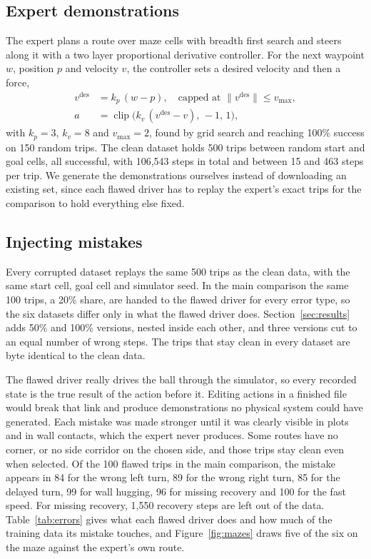 \documentclass[conference]{IEEEtran}
\DeclareMathOperator{\clip}{clip}
\begin{document}
\subsection{Expert demonstrations}
The expert plans a route over maze cells with breadth first search and steers along it with a two layer
proportional derivative controller. For the next waypoint $w$, position $p$ and velocity $v$, the controller sets
a desired velocity and then a force,
\begin{align}
v^{\text{des}}&=k_p\,(w-p),\quad \text{capped at } \|v^{\text{des}}\|\le v_{\max},\\
a&=\clip\!\big(k_v\,(v^{\text{des}}-v),\,-1,\,1\big),
\end{align}
with $k_p=3$, $k_v=8$ and $v_{\max}=2$, found by grid search and reaching 100\% success on 150 random trips. The
clean dataset holds 500 trips between random start and goal cells, all successful, with 106{,}543 steps in total
and between 15 and 463 steps per trip. We generate the demonstrations ourselves instead of downloading an
existing set, since each flawed driver has to replay the expert's exact trips for the comparison to hold
everything else fixed.

\subsection{Injecting mistakes}
Every corrupted dataset replays the same 500 trips as the clean data, with the same start cell, goal cell and
simulator seed. In the main comparison the same 100 trips, a 20\% share, are handed to the flawed driver for
every error type, so the six datasets differ only in what the flawed driver does. Section~\ref{sec:results} adds
50\% and 100\% versions, nested inside each other, and three versions cut to an equal number of wrong steps. The
trips that stay clean in every dataset are byte identical to the clean data.

The flawed driver really drives the ball through the simulator, so every recorded state is the true result of the
action before it. Editing actions in a finished file would break that link and produce demonstrations no physical
system could have generated. Each mistake was made stronger until it was clearly visible in plots and in wall
contacts, which the expert never produces. Some routes have no corner, or no side corridor on the chosen side,
and those trips stay clean even when selected. Of the 100 flawed trips in the main comparison, the mistake
appears in 84 for the wrong left turn, 89 for the wrong right turn, 85 for the delayed turn, 99 for wall hugging,
96 for missing recovery and 100 for the fast speed. For missing recovery, 1{,}550 recovery steps are left out of
the data. Table~\ref{tab:errors} gives what each flawed driver does and how much of the training data its mistake
touches, and Figure~\ref{fig:mazes} draws five of the six on the maze against the expert's own route.
\end{document}
